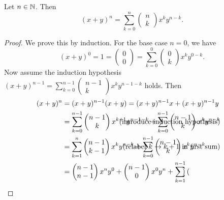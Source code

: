 \begin{theorem} \label{binomialIdentity}
Let $n\in \mathbb{N}$. Then
\[ (x+y)^n = \sum_{k=0}^n \begin{pmatrix}
n \\ k
\end{pmatrix}x^k y^{n-k}. \]
\end{theorem}
\begin{proof}
We prove this by induction. For the base case $n=0$, we have
\[ (x+y)^0 = 1 = \begin{pmatrix}
0 \\ 0
\end{pmatrix} = \sum_{k=0}^0 \begin{pmatrix}
0 \\ k
\end{pmatrix}x^k y^{0-k}. \]
Now assume the induction hypothesis $(x+y)^{n-1} = \sum_{k=0}^{n-1} \begin{pmatrix}
n-1 \\ k
\end{pmatrix}x^k y^{n-1-k}$ holds. Then
\begin{align*}
(x+y)^n &= (x+y)^{n-1}(x+y) = (x+y)^{n-1}x + (x+y)^{n-1}y \\
&= \sum_{k=0}^{n-1} \begin{pmatrix}
n-1 \\ k
\end{pmatrix}x^{k+1} y^{n-1-k} + \sum_{k=0}^{n-1} \begin{pmatrix}
n-1 \\ k
\end{pmatrix}x^{k} y^{n-k} &\hspace{-22em}\text{(introduce induction hypothesis)}& \\
&= \sum_{k=1}^{n} \begin{pmatrix}
n-1 \\ k-1
\end{pmatrix}x^{k} y^{n-k} + \sum_{k=0}^{n-1} \begin{pmatrix}
n-1 \\ k
\end{pmatrix}x^{k} y^{n-k} &\hspace{-22em}\text{(relabel $k\to k+1$ in first sum)}& \\
&= \begin{pmatrix}
n-1 \\ n-1
\end{pmatrix}x^ny^{0} + \begin{pmatrix}
n-1 \\ 0
\end{pmatrix}x^0y^n + \sum_{k=1}^{n-1} \begin{pmatrix}

\end{pmatrix}
\end{align*}
\end{proof}
